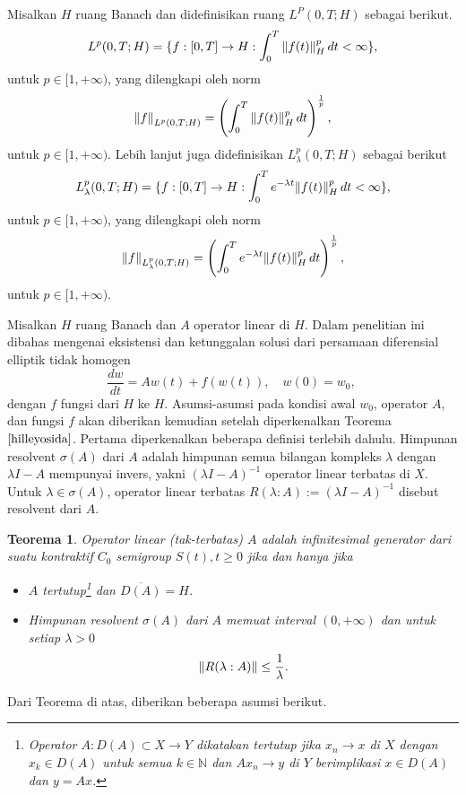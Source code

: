 \documentclass[journal]{IEEEtran}
\newtheorem{teo}[defn]{Teorema}
\theoremstyle{definition}
\theoremstyle{definition}
\theoremstyle{plain}
\newcommand{\normlp}[1]{\left\|#1\right\|_{L^p_{\lambda}(0,T;H)}}%
\renewcommand{\natural}{\mathbb{N}}
\begin{document}
Misalkan $H$ ruang Banach dan didefinisikan ruang $L^P(0,T;H)$ sebagai berikut.
\begin{equation*}
    L^p(0,T;H)=\{f:[0,T]\rightarrow H:\int_0^T \norm{f(t)}^p_H \, dt <\infty\}, 
\end{equation*}
untuk $p\in[1,+\infty)$, yang dilengkapi oleh norm
\begin{equation*}
    \norm{f}_{L^{p}(0,T;H)} = \left(\int_0^T \norm{f(t)}^p_H \, dt\right)^{\frac{1}{p}}, 
\end{equation*}
untuk $p\in[1,+\infty)$.
Lebih lanjut juga didefinisikan $L^p_{\lambda} (0,T;H)$ sebagai berikut 
\begin{equation*}
    L^p_{\lambda}(0,T;H)=\{f:[0,T]\rightarrow H:\int_0^T e^{-\lambda t}\norm{f(t)}^p_H \, dt <\infty\},
\end{equation*}
untuk $p\in[1,+\infty)$, yang dilengkapi oleh norm 
\begin{equation*}
    \normlp{f} = \left(\int_0^T e^{-\lambda t}\norm{f(t)}^p_H \, dt\right)^{\frac{1}{p}}, 
\end{equation*}
untuk $p\in[1,+\infty)$.

Misalkan $H$ ruang Banach dan $A$ operator linear di $H$. Dalam penelitian ini dibahas mengenai eksistensi dan ketunggalan solusi dari persamaan diferensial elliptik tidak homogen
\begin{equation}
    \dfrac{dw}{dt} = Aw(t) + f(w(t)), \quad w(0)=w_0,~ \label{eq:persdif}
\end{equation}
dengan $f$ fungsi dari $H$ ke $H$. Asumsi-asumsi pada kondisi awal $w_0$, operator $A$, dan fungsi $f$ akan diberikan kemudian setelah diperkenalkan Teorema $\ref{hilleyosida}$. Pertama diperkenalkan beberapa definisi terlebih dahulu. Himpunan resolvent $\sigma(A)$ dari $A$ adalah himpunan semua bilangan kompleks $\lambda$ dengan $\lambda I-A$ mempunyai invers, yakni $(\lambda I -A)^{-1}$ operator linear terbatas di $X$. Untuk $\lambda \in \sigma(A)$, operator linear terbatas $R(\lambda:A):=(\lambda I-A)^{-1}$ disebut resolvent dari $A$. 

\begin{teo}\label{hilleyosida}
    \cite{Pazy1983} Operator linear (tak-terbatas) $A$ adalah infinitesimal generator dari suatu kontraktif $C_0$ semigroup $S(t), t\geq 0$ jika dan hanya jika
    \begin{itemize}
        \item $A$ tertutup\footnote{Operator $A:D(A)\subset X\rightarrow Y$ dikatakan tertutup jika $x_n\rightarrow x$ di $X$ dengan $x_k\in D(A)$ untuk semua $k\in\natural$ dan $Ax_n\rightarrow y$ di $Y$ berimplikasi $x\in D(A)$ dan $y=Ax$.} dan $\overline{D(A)}=H$.
        \item Himpunan resolvent $\sigma(A)$ dari $A$ memuat interval $(0,+\infty)$ dan untuk setiap $\lambda>0$
        \begin{equation*}
            \norm{R(\lambda:A)} \leq \dfrac{1}{\lambda}.
        \end{equation*}
    \end{itemize}
\end{teo}
Dari Teorema di atas, diberikan beberapa asumsi berikut.
\end{document}
